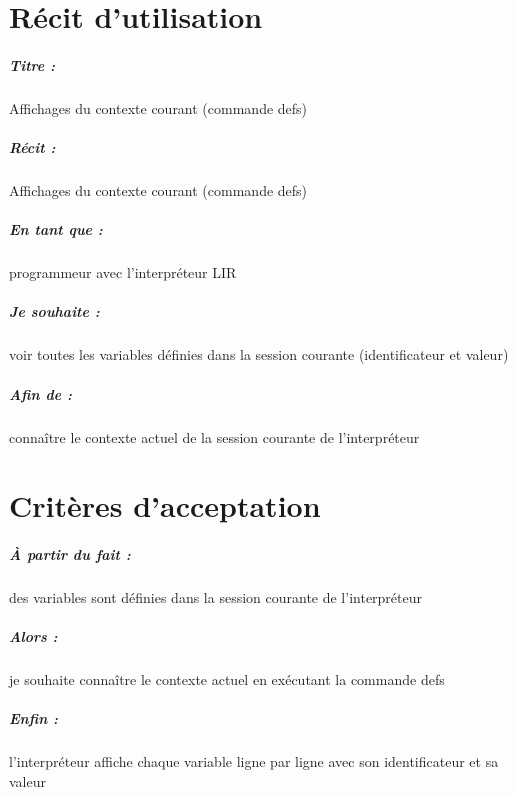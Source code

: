 \documentclass[12pt,a5paper, notitle, oneside]{report}
\begin{document}
    \chapter*{Récit d'utilisation}

    \paragraph{Titre : } Affichages du contexte courant (commande defs) %
    \paragraph{Récit : } Affichages du contexte courant (commande defs) %
    \paragraph{En tant que : } programmeur avec l'interpréteur LIR %
    \paragraph{Je souhaite : } voir toutes les variables définies dans la session courante (identificateur et valeur) 
    \paragraph{Afin de : } connaître le contexte actuel de la session courante de l'interpréteur
    \newpage

    \chapter*{Critères d'acceptation}

    \paragraph{À partir du fait : } des variables sont définies dans la session courante de l'interpréteur
    \paragraph{Alors : } je souhaite connaître le contexte actuel en exécutant la commande defs
    \paragraph{Enfin : } l'interpréteur affiche chaque variable ligne par ligne avec son identificateur et sa valeur
\end{document}
